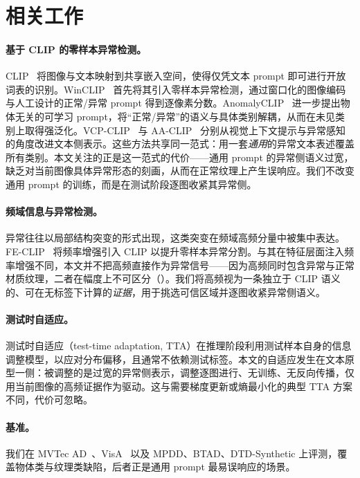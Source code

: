 \section{相关工作}
\label{sec:related}

\paragraph{基于 CLIP 的零样本异常检测。}
CLIP~\cite{radford2021clip} 将图像与文本映射到共享嵌入空间，使得仅凭文本 prompt 即可进行开放词表的识别。WinCLIP~\cite{jeong2023winclip} 首先将其引入零样本异常检测，通过窗口化的图像编码与人工设计的正常/异常 prompt 得到逐像素分数。AnomalyCLIP~\cite{zhou2024anomalyclip} 进一步提出物体无关的可学习 prompt，将“正常/异常”的语义与具体类别解耦，从而在未见类别上取得强泛化。VCP-CLIP~\cite{qu2024vcpclip} 与 AA-CLIP~\cite{ma2025aaclip} 分别从视觉上下文提示与异常感知的角度改进文本侧表示。这些方法共享同一范式：用一套\emph{通用}的异常文本表述覆盖所有类别。本文关注的正是这一范式的代价——通用 prompt 的异常侧语义过宽，缺乏对当前图像具体异常形态的刻画，从而在正常纹理上产生误响应。我们不改变通用 prompt 的训练，而是在测试阶段逐图收紧其异常侧。

\paragraph{频域信息与异常检测。}
异常往往以局部结构突变的形式出现，这类突变在频域高频分量中被集中表达。FE-CLIP~\cite{gong2025feclip} 将频率增强引入 CLIP 以提升零样本异常分割。与其在特征层面注入频率增强不同，本文并不把高频直接作为异常信号——因为高频同时包含异常与正常材质纹理，二者在幅度上不可区分（）。我们将高频视为一条独立于 CLIP 语义的、可在无标签下计算的\emph{证据}，用于挑选可信区域并逐图收紧异常侧语义。

\paragraph{测试时自适应。}
测试时自适应（test-time adaptation, TTA）在推理阶段利用测试样本自身的信息调整模型，以应对分布偏移，且通常不依赖测试标签。本文的自适应发生在文本原型一侧：被调整的是过宽的异常侧表示，调整逐图进行、无训练、无反向传播，仅用当前图像的高频证据作为驱动。这与需要梯度更新或熵最小化的典型 TTA 方案不同，代价可忽略。

\paragraph{基准。}
我们在 MVTec AD~\cite{bergmann2019mvtec}、VisA~\cite{zou2022visa} 以及 MPDD、BTAD、DTD-Synthetic 上评测，覆盖物体类与纹理类缺陷，后者正是通用 prompt 最易误响应的场景。
